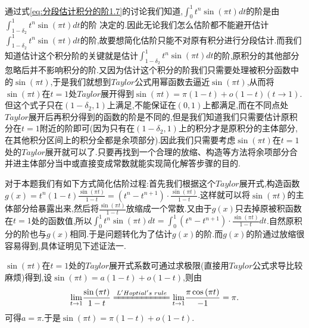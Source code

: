 \documentclass[lang=cn,newtx,10pt,scheme=chinese]{../Template/elegantbook}
\begin{document}
\begin{note}
通过式\ref{eq:分段估计积分的阶1.7}的讨论我们知道,$\int_0^1{t^n\sin \left( \pi t \right) dt}$的阶是由$\int_{1-\delta_2}^1{t^n\sin \left( \pi t \right) dt}$的阶
决定的.因此无论我们怎么估阶都不能避开估计$\int_{1-\delta_2}^1{t^n\sin \left( \pi t \right) dt}$的阶,故要想简化估阶只能不对原有积分进行分段估计.而我们知道估计这个积分阶的关键就是估计$\int_{1-\delta_2}^1{t^n\sin \left( \pi t \right) dt}$的阶,原积分的其他部分忽略后并不影响积分的阶.又因为估计这个积分的阶我们只需要处理被积分函数中的$\sin(\pi t)$,于是我们就想到$Taylor$公式用幂函数去逼近$\sin(\pi t)$,从而将$\sin(\pi t)$在$t=1$处$Taylor$展开得到$\sin \left( \pi t \right) =\pi\left( 1-t \right) +o\left( 1-t \right)$$(t\to 1)$.但这个式子只在$(1-\delta_2,1)$上满足,不能保证在$(0,1)$上都满足,而在不同点处$Taylor$展开后再积分得到的函数的阶是不同的,但是我们知道我们只需要估计原积分在$t=1$附近的阶即可(因为只有在$(1-\delta_2,1)$上的积分才是原积分的主体部分,在其他积分区间上的积分全都是余项部分).因此我们只需要考虑$\sin(\pi t)$在$t=1$处的$Taylor$展开就可以了.只要再找到一个合理的放缩、构造等方法将余项部分合并进主体部分当中或直接变成常数就能实现简化解答步骤的目的.

对于本题我们有如下方式简化估阶过程:首先我们根据这个$Taylor$展开式,构造函数$g\left( x \right) =t^n\left( 1-t \right) \frac{\sin \left( \pi t \right)}{1-t}=\left( t^n-t^{n+1} \right) \cdot \frac{\sin \left( \pi t \right)}{1-t}$.这样就可以将$\sin(\pi t)$的主体部分给暴露出来,然后将$\frac{\sin(\pi t)}{1-t}$放缩成一个常数.又由于$g(x)$只去掉原被积函数在$t=1$处的函数值,所以$\int_0^1{t^n\sin \left( \pi t \right) dt}=\int_0^1{\left( t^n-t^{n+1} \right) \cdot \frac{\sin \left( \pi t \right)}{1-t}dt}$.自然原积分的阶也与$g(x)$相同.于是问题转化为了估计$g(x)$的阶.而$g(x)$的阶通过放缩很容易得到,具体证明见下述证法一.
\end{note}
\begin{remark}
$\sin(\pi t)$在$t=1$处的$Taylor$展开式系数可通过求极限(直接用$Taylor$公式求导比较麻烦)得到,设$\sin \left( \pi t \right) =a\left( 1-t \right) +o\left( 1-t \right)$,则由
\begin{align*}
\underset{t\rightarrow 1}{\lim}\frac{\sin \left( \pi t \right)}{1-t}\xlongequal[]{L'Hoptial's\,\,rule}\underset{t\rightarrow 1}{\lim}\frac{\pi \cos \left( \pi t \right)}{-1}=\pi.
\end{align*} 
可得$a=\pi$.于是$\sin \left( \pi t \right) =\pi\left( 1-t \right) +o\left( 1-t \right)$.
\end{remark}
\end{document}

